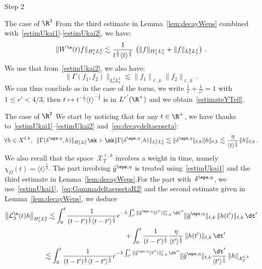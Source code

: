 \begin{step}{Step 2}
\begin{step}{The case of $\R^3$}
From the third estimate in Lemma~\ref{lem:decayWeps} combined with~\eqref{estimUkai1}-\eqref{estimUkai2}, we have:
\[
\|W^\e(t) f\|_{H^\ell_xL^2_v} \lesssim \frac{1}{{t^\frac12\langle t \rangle^{\frac 34}}} \, \left(\|f\|_{H^\ell_xL^2_v} +\|f\|_{L^2_vL^1_x}\right)\,.
\]
We use that from~\eqref{estimUkai2}, we also have:
\[
\|\Gamma(f_1,f_2)\|_{{L^2_vL^1_x}}\lesssim \| f_1 \|_{{\ell,k}} \| f_2\|_{{\ell,k}} \,.
\]
We can thus conclude as in the case of the torus, we write $ \frac1r+\frac1{r'} = 1$ with $1\leq r'<4/3$, then $t \mapsto t^{-\frac12} \langle t \rangle^{-\frac 34}$ is in $L^{r'}(\R^+)$ and we obtain~\eqref{estimateYTell}.
\end{step}

\begin{step}{The case of $\R^2$}
We start by noticing that for any $t \in \R^+$, we have thanks to~\eqref{estimUkai1}--\eqref{estimUkai2} and~\eqref{eq:decaydeltaepseta}:
\begin{equation}\label{eq:GammadeltaepsetaR2}
\!\forall h \in X^{\ell,k},\;\:
\|\Gamma(\delta^{\eps,\eta},h)\|_{H^\ell_xL^2_v} \mk+\mk \|\Gamma(\delta^{\eps,\eta},h)\|_{L^2_vL^1_x}
\lesssim \|\delta^{\eps,\eta}\|_{\ell,k} \|h\|_{\ell,k}\lesssim \frac{\eta}{\langle t \rangle^{\frac12}} \|h\|_{\ell,k} \,.\!
\end{equation}
We also recall that the space~$\mathcal{X}_T^{\ell,k}$ involves a weight in time, namely~$\chi_\Omega(t)= \langle t \rangle^\frac14$. The part involving $\bar g^{\eps,\eta}$ is treated using~\eqref{estimUkai1} and the third estimate in Lemma~\ref{lem:decayWeps}.\linebreak For the part with~$\delta^{\eps,\eta}$, we use~\eqref{estimUkai1},~\eqref{eq:GammadeltaepsetaR2} and the second estimate given in Lemma~\ref{lem:decayWeps}, we deduce
\begin{align*}
& \big \| \mathcal{L}_\lambda^{\e}(t) h\big\|_{H^\ell_xL^2_v} \lesssim \int_0^t \frac{1}{(t-t')^\frac12\langle t-t' \rangle^\frac12} e^{- \lambda \int_{t'}^t \|\overline g^{\eps,\eta}(t'')\|_{\ell,k}^r\, \dt''}
\|\overline g^{\eps,\eta}\|_{\ell,k} \, \|h(t')\|_{\ell,k} \, \dt' \\
&\mkern 323mu + \int_0^t \frac{1}{(t-t')^\frac12} \frac{\eta}{\langle t' \rangle^{\frac12}} \, \|h(t')\|_{\ell,k} \, \dt'\\
&\mkern 105mu \lesssim \int_0^t \frac{1}{(t-t')^\frac12\langle t-t' \rangle^\frac12} e^{- \lambda \int_{t'}^t \|\overline g^{\eps,\eta}(t'')\|_{\ell,k}^r\, \dt''} \|\overline g^{\eps,\eta}\|_{\ell,k} \frac{\dt'}{{\langle t' \rangle^{\frac14}}} \, \|h\|_{\mathcal{X}_T^{\ell,k}} \\

\end{align*}
\end{step}
\end{step}
